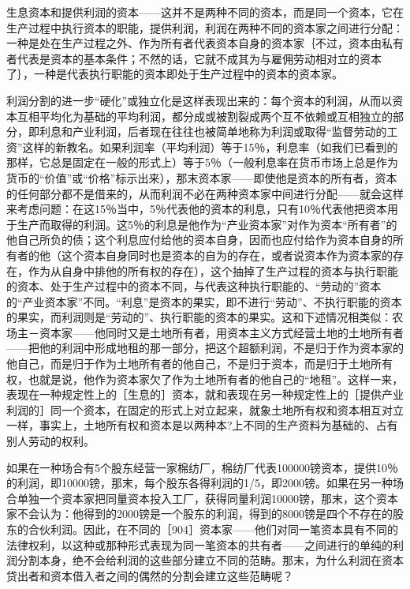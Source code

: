 生息资本和提供利润的资本——这并不是两种不同的资本，而是同一个资本，它在生产过程中执行资本的职能，提供利润，利润在两种不同的资本家之间进行分配：一种是处在生产过程之外、作为所有者代表资本自身的资本家｛不过，资本由私有者代表是资本的基本条件；不然的话，它就不成其为与雇佣劳动相对立的资本了｝，一种是代表执行职能的资本即处于生产过程中的资本的资本家。


利润分割的进一步“硬化”或独立化是这样表现出来的：每个资本的利润，从而以资本互相平均化为基础的平均利润，都分成或被割裂成两个互不依赖或互相独立的部分，即利息和产业利润，后者现在往往也被简单地称为利润或取得“监督劳动的工资”这样的新教名。如果利润率（平均利润）等于15％，利息率（如我们已看到的那样，它总是固定在一般的形式上）等于5％（一般利息率在货币市场上总是作为货币的“价值”或“价格”标示出来），那末资本家——即使他是资本的所有者，资本的任何部分都不是借来的，从而利润不必在两种资本家中间进行分配——就会这样来考虑问题：在这15％当中，5％代表他的资本的利息，只有10％代表他把资本用于生产而取得的利润。这5％的利息是他作为“产业资本家”对作为资本“所有者”的他自己所负的债；这个利息应付给他的资本自身，因而也应付给作为资本自身的所有者的他（这个资本自身同时也是资本的自为的存在，或者说资本作为资本家的存在，作为从自身中排他的所有权的存在），这个抽掉了生产过程的资本与执行职能的资本、处于生产过程中的资本不同，与代表这种执行职能的、“劳动的”资本的“产业资本家”不同。“利息”是资本的果实，即不进行“劳动”、不执行职能的资本的果实，而利润则是“劳动的”、执行职能的资本的果实。这和下述情况相类似：农场主－资本家——他同时又是土地所有者，用资本主义方式经营土地的土地所有者——把他的利润中形成地租的那一部分，把这个超额利润，不是归于作为资本家的他自己，而是归于作为土地所有者的他自己，不是归于资本，而是归于土地所有权，也就是说，他作为资本家欠了作为土地所有者的他自己的“地租”。这样一来，表现在一种规定性上的［生息的］资本，就和表现在另一种规定性上的［提供产业利润的］同一个资本，在固定的形式上对立起来，就象土地所有权和资本相互对立一样，事实上，土地所有权和资本是以两种本?上不同的生产资料为基础的、占有别人劳动的权利。

如果在一种场合有5个股东经营一家棉纺厂，棉纺厂代表100000镑资本，提供10％的利润，即10000镑，那末，每个股东各得利润的1/5，即2000镑。如果在另一种场合单独一个资本家把同量资本投入工厂，获得同量利润10000镑，那末，这个资本家不会认为：他得到的2000镑是一个股东的利润，得到的8000镑是四个不存在的股东的合伙利润。因此，在不同的［904］资本家——他们对同一笔资本具有不同的法律权利，以这种或那种形式表现为同一笔资本的共有者——之间进行的单纯的利润分割本身，绝不会给利润的这些部分建立不同的范畴。那末，为什么利润在资本贷出者和资本借入者之间的偶然的分割会建立这些范畴呢？

